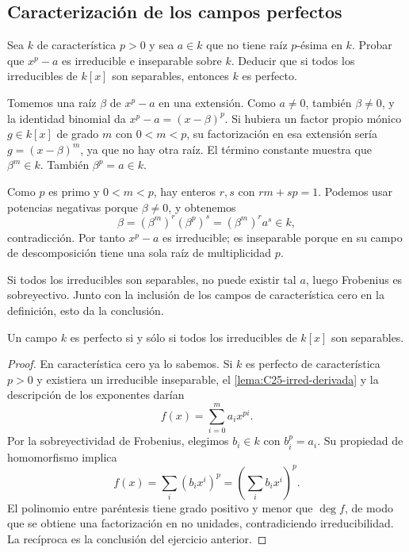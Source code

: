 \subsection{Caracterización de los campos perfectos}
\begin{ejer}\label{ejer:C25-no-perfecto}
Sea $k$ de característica $p>0$ y sea $a\in k$ que no tiene raíz $p$-ésima en $k$. Probar que $x^p-a$ es irreducible e inseparable sobre $k$. Deducir que si todos los irreducibles de $k[x]$ son separables, entonces $k$ es perfecto.
\end{ejer}
\begin{sol}
Tomemos una raíz $\beta$ de $x^p-a$ en una extensión. Como $a\ne0$, también $\beta\ne0$, y la identidad binomial da $x^p-a=(x-\beta)^p$. Si hubiera un factor propio mónico $g\in k[x]$ de grado $m$ con $0<m<p$, su factorización en esa extensión sería $g=(x-\beta)^m$, ya que no hay otra raíz. El término constante muestra que $\beta^m\in k$. También $\beta^p=a\in k$.

Como $p$ es primo y $0<m<p$, hay enteros $r,s$ con $rm+sp=1$. Podemos usar potencias negativas porque $\beta\ne0$, y obtenemos
\[
\beta=(\beta^m)^r(\beta^p)^s=(\beta^m)^r a^s\in k,
\]
contradicción. Por tanto $x^p-a$ es irreducible; es inseparable porque en su campo de descomposición tiene una sola raíz de multiplicidad $p$.

Si todos los irreducibles son separables, no puede existir tal $a$, luego Frobenius es sobreyectivo. Junto con la inclusión de los campos de característica cero en la definición, esto da la conclusión.
\end{sol}

\begin{prop}\label{prop:C25-perfecto}
Un campo $k$ es perfecto si y sólo si todos los irreducibles de $k[x]$ son separables.
\end{prop}
\begin{proof}
En característica cero ya lo sabemos. Si $k$ es perfecto de característica $p>0$ y existiera un irreducible inseparable, el \cref{lema:C25-irred-derivada} y la descripción de los exponentes darían
\[
f(x)=\sum_{i=0}^m a_i x^{pi}.
\]
Por la sobreyectividad de Frobenius, elegimos $b_i\in k$ con $b_i^p=a_i$. Su propiedad de homomorfismo implica
\[
f(x)=\sum_i(b_ix^i)^p=\left(\sum_i b_ix^i\right)^p.
\]
El polinomio entre paréntesis tiene grado positivo y menor que $\deg f$, de modo que se obtiene una factorización en no unidades, contradiciendo irreducibilidad. La recíproca es la conclusión del ejercicio anterior.
\end{proof}

